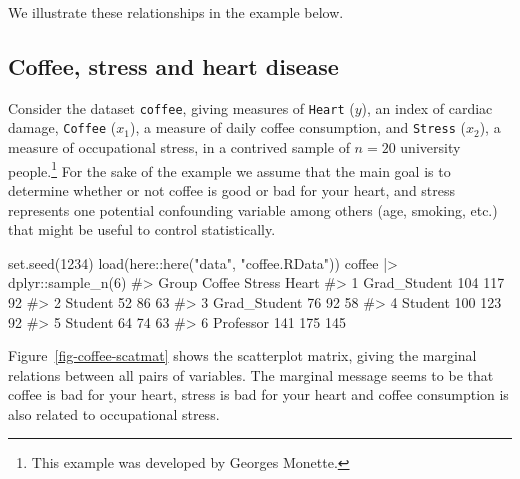 \documentclass[
  letterpaper,
  10pt,
  krantz2]{krantz}
\makeatletter
\newenvironment{Shaded}{\begin{snugshade}}{\end{snugshade}}
\newcommand{\CommentTok}[1]{\textcolor[rgb]{0.37,0.37,0.37}{#1}}
\newcommand{\DecValTok}[1]{\textcolor[rgb]{0.68,0.00,0.00}{#1}}
\newcommand{\FunctionTok}[1]{\textcolor[rgb]{0.28,0.35,0.67}{#1}}
\newcommand{\NormalTok}[1]{\textcolor[rgb]{0.00,0.23,0.31}{#1}}
\newcommand{\SpecialCharTok}[1]{\textcolor[rgb]{0.37,0.37,0.37}{#1}}
\newcommand{\StringTok}[1]{\textcolor[rgb]{0.13,0.47,0.30}{#1}}
\newenvironment{kframe}{%
  \medskip{}
  \setlength{\fboxsep}{.8em}
  \def\at@end@of@kframe{}%
  \ifinner\ifhmode%
  \def\at@end@of@kframe{\end{minipage}}%
  \begin{minipage}{\columnwidth}%
  \fi\fi%
  \def\FrameCommand##1{\hskip\@totalleftmargin \hskip-\fboxsep
  \colorbox{shadecolor}{##1}\hskip-\fboxsep
      \hskip-\linewidth \hskip-\@totalleftmargin \hskip\columnwidth}%
  \MakeFramed {\advance\hsize-\width
    \@totalleftmargin\z@ \linewidth\hsize
    \@setminipage}}%
{\par\unskip\endMakeFramed%
  \at@end@of@kframe}
\renewenvironment{Shaded}{\begin{kframe}}{\end{kframe}}
\makeatother
\begin{document}
We illustrate these relationships in the example below.

\subsection{Coffee, stress and heart
disease}\label{coffee-stress-and-heart-disease}

Consider the dataset \texttt{coffee}, giving measures of \texttt{Heart}
(\(y\)), an index of cardiac damage, \texttt{Coffee} (\(x_1\)), a
measure of daily coffee consumption, and \texttt{Stress} (\(x_2\)), a
measure of occupational stress, in a contrived sample of \(n=20\)
university people.\footnote{This example was developed by Georges
  Monette.} For the sake of the example we assume that the main goal is
to determine whether or not coffee is good or bad for your heart, and
stress represents one potential confounding variable among others (age,
smoking, etc.) that might be useful to control statistically.

\begin{Shaded}
\begin{Highlighting}[]
\FunctionTok{set.seed}\NormalTok{(}\DecValTok{1234}\NormalTok{)}
\FunctionTok{load}\NormalTok{(here}\SpecialCharTok{::}\FunctionTok{here}\NormalTok{(}\StringTok{"data"}\NormalTok{, }\StringTok{"coffee.RData"}\NormalTok{))}
\NormalTok{coffee }\SpecialCharTok{|\textgreater{}}\NormalTok{ dplyr}\SpecialCharTok{::}\FunctionTok{sample\_n}\NormalTok{(}\DecValTok{6}\NormalTok{)}
\CommentTok{\#\textgreater{}          Group Coffee Stress Heart}
\CommentTok{\#\textgreater{} 1 Grad\_Student    104    117    92}
\CommentTok{\#\textgreater{} 2      Student     52     86    63}
\CommentTok{\#\textgreater{} 3 Grad\_Student     76     92    58}
\CommentTok{\#\textgreater{} 4      Student    100    123    92}
\CommentTok{\#\textgreater{} 5      Student     64     74    63}
\CommentTok{\#\textgreater{} 6    Professor    141    175   145}
\end{Highlighting}
\end{Shaded}

Figure~\ref{fig-coffee-scatmat} shows the scatterplot matrix, giving the
marginal relations between all pairs of variables. The marginal message
seems to be that coffee is bad for your heart, stress is bad for your
heart and coffee consumption is also related to occupational stress.
\end{document}
